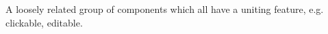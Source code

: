 \item[Abstract Component Family]{A loosely related group of  
components which all 
have a uniting feature, e.g. clickable, editable.
}
